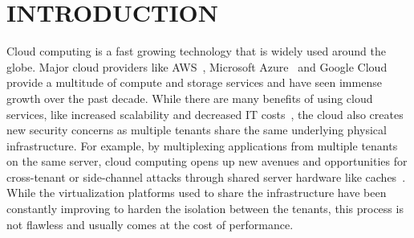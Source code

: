 \section{INTRODUCTION}
\label{sec:intro}



Cloud computing is a fast growing technology that is widely used around the
globe. Major cloud providers like AWS~\cite{awscloud}, Microsoft
Azure~\cite{azurecloud} and Google Cloud~\cite{googlecloud} provide a multitude
of compute and storage services and have seen immense growth over the past
decade. While there are many benefits of using cloud services, like
increased scalability and decreased IT costs~\cite{Armbrust}, the cloud also
creates new security concerns as multiple tenants share the same underlying
physical infrastructure. For example, by multiplexing applications from multiple
tenants on the same server, cloud computing opens up new avenues and
opportunities for cross-tenant or side-channel attacks through shared server 
hardware like caches~\cite{meltdown, xuccsw2011}. 
While the virtualization platforms used to
share the infrastructure have been constantly improving to harden the isolation
between the tenants, this process is not flawless and usually comes at the 
cost of performance.


